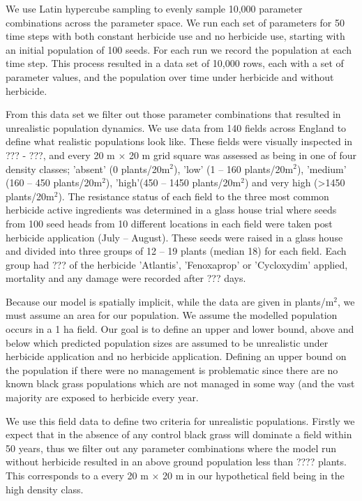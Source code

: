 \documentclass[12pt, a4paper]{article}
\begin{document}
We use Latin hypercube sampling to evenly sample 10,000 parameter combinations across the parameter space. We run each set of parameters for 50 time steps with both constant herbicide use and no herbicide use, starting with an initial population of 100 seeds. For each run we record the population at each time step. This process resulted in a data set of 10,000 rows, each with a set of parameter values, and the population over time under herbicide and without herbicide.  

From this data set we filter out those parameter combinations that resulted in unrealistic population dynamics. We use data from 140 fields across England to define what realistic populations look like. These fields were visually inspected in ??? - ???, and every 20 m $\times$ 20 m grid square was assessed as being in one of four density classes; 'absent' (0 plants/20m$^2$), 'low' (1 -- 160 plants/20m$^2$), 'medium' (160 -- 450 plants/20m$^2$), 'high'(450 -- 1450 plants/20m$^2$) and very high (>1450 plants/20m$^2$). The resistance status of each field to the three most common herbicide active ingredients was determined in a glass house trial where seeds from 100 seed heads from 10 different locations in each field were taken post herbicide application (July -- August). These seeds were raised in a glass house and divided into three groups of 12 -- 19 plants (median 18) for each field. Each group had ??? of the herbicide 'Atlantis', 'Fenoxaprop' or 'Cycloxydim' applied, mortality and any damage were recorded after ??? days. 

Because our model is spatially implicit, while the data are given in plants/m$^2$, we must assume an area for our population. We assume the modelled population occurs in a 1 ha field. Our goal is to define an upper and lower bound, above and below which predicted population sizes are assumed to be unrealistic under herbicide application and no herbicide application. Defining an upper bound on the population if there were no management is problematic since there are no known black grass populations which are not managed in some way (and the vast majority are exposed to herbicide every year.    

We use this field data to define two criteria for unrealistic populations. Firstly we expect that in the absence of any control black grass will dominate a field within 50 years, thus we filter out any parameter combinations where the model run without herbicide resulted in an above ground population less than ???? plants. This corresponds to a every 20 m $\times$ 20 m in our hypothetical field being in the high density class.          
\end{document}
